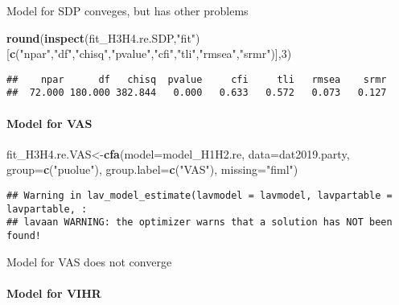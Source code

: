 \documentclass[
]{article}
\newenvironment{Shaded}{\begin{snugshade}}{\end{snugshade}}
\newcommand{\DataTypeTok}[1]{\textcolor[rgb]{0.13,0.29,0.53}{#1}}
\newcommand{\DecValTok}[1]{\textcolor[rgb]{0.00,0.00,0.81}{#1}}
\newcommand{\KeywordTok}[1]{\textcolor[rgb]{0.13,0.29,0.53}{\textbf{#1}}}
\newcommand{\NormalTok}[1]{#1}
\newcommand{\StringTok}[1]{\textcolor[rgb]{0.31,0.60,0.02}{#1}}
\begin{document}
Model for SDP conveges, but has other problems

\begin{Shaded}
\begin{Highlighting}[]
\KeywordTok{round}\NormalTok{(}\KeywordTok{inspect}\NormalTok{(fit_H3H4.re.SDP,}\StringTok{"fit"}\NormalTok{)}
\NormalTok{      [}\KeywordTok{c}\NormalTok{(}\StringTok{"npar"}\NormalTok{,}\StringTok{"df"}\NormalTok{,}\StringTok{"chisq"}\NormalTok{,}\StringTok{"pvalue"}\NormalTok{,}\StringTok{"cfi"}\NormalTok{,}\StringTok{"tli"}\NormalTok{,}\StringTok{"rmsea"}\NormalTok{,}\StringTok{"srmr"}\NormalTok{)],}\DecValTok{3}\NormalTok{)}
\end{Highlighting}
\end{Shaded}

\begin{verbatim}
##    npar      df   chisq  pvalue     cfi     tli   rmsea    srmr 
##  72.000 180.000 382.844   0.000   0.633   0.572   0.073   0.127
\end{verbatim}

\newpage

\hypertarget{model-for-vas}{%
\paragraph{Model for VAS}\label{model-for-vas}}

\begin{Shaded}
\begin{Highlighting}[]
\NormalTok{fit_H3H4.re.VAS<-}\KeywordTok{cfa}\NormalTok{(}\DataTypeTok{model=}\NormalTok{model_H1H2.re,}
                    \DataTypeTok{data=}\NormalTok{dat2019.party,}
                    \DataTypeTok{group=}\KeywordTok{c}\NormalTok{(}\StringTok{"puolue"}\NormalTok{),}
                    \DataTypeTok{group.label=}\KeywordTok{c}\NormalTok{(}\StringTok{"VAS"}\NormalTok{),}
                    \DataTypeTok{missing=}\StringTok{"fiml"}\NormalTok{)}
\end{Highlighting}
\end{Shaded}

\begin{verbatim}
## Warning in lav_model_estimate(lavmodel = lavmodel, lavpartable = lavpartable, :
## lavaan WARNING: the optimizer warns that a solution has NOT been found!
\end{verbatim}

Model for VAS does not converge

\newpage

\hypertarget{model-for-vihr}{%
\paragraph{Model for VIHR}\label{model-for-vihr}}
\end{document}
